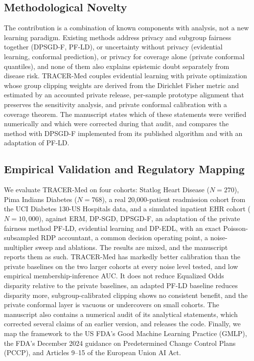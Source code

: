 \documentclass[11pt,a4paper]{article}
\begin{document}
\subsection*{Methodological Novelty}
The contribution is a combination of known components with analysis, not a new learning paradigm. Existing methods address privacy and subgroup fairness together (DPSGD-F, PF-LD), or uncertainty without privacy (evidential learning, conformal prediction), or privacy for coverage alone (private conformal quantiles), and none of them also explains epistemic doubt separately from disease risk. TRACER-Med couples evidential learning with private optimization whose group clipping weights are derived from the Dirichlet Fisher metric and estimated by an accounted private release, per-sample prototype alignment that preserves the sensitivity analysis, and private conformal calibration with a coverage theorem. The manuscript states which of these statements were verified numerically and which were corrected during that audit, and compares the method with DPSGD-F implemented from its published algorithm and with an adaptation of PF-LD.

\subsection*{Empirical Validation and Regulatory Mapping}
We evaluate TRACER-Med on four cohorts: Statlog Heart Disease ($N=270$), Pima Indians Diabetes ($N=768$), a real 20,000-patient readmission cohort from the UCI Diabetes 130-US Hospitals data, and a simulated inpatient EHR cohort ($N=10{,}000$), against ERM, DP-SGD, DPSGD-F, an adaptation of the private fairness method PF-LD, evidential learning and DP-EDL, with an exact Poisson-subsampled RDP accountant, a common decision operating point, a noise-multiplier sweep and ablations. The results are mixed, and the manuscript reports them as such. TRACER-Med has markedly better calibration than the private baselines on the two larger cohorts at every noise level tested, and low empirical membership-inference AUC. It does not reduce Equalized Odds disparity relative to the private baselines, an adapted PF-LD baseline reduces disparity more, subgroup-calibrated clipping shows no consistent benefit, and the private conformal layer is vacuous or undercovers on small cohorts. The manuscript also contains a numerical audit of its analytical statements, which corrected several claims of an earlier version, and releases the code. Finally, we map the framework to the US FDA's Good Machine Learning Practice (GMLP), the FDA's December 2024 guidance on Predetermined Change Control Plans (PCCP), and Articles 9–15 of the European Union AI Act.
\end{document}
